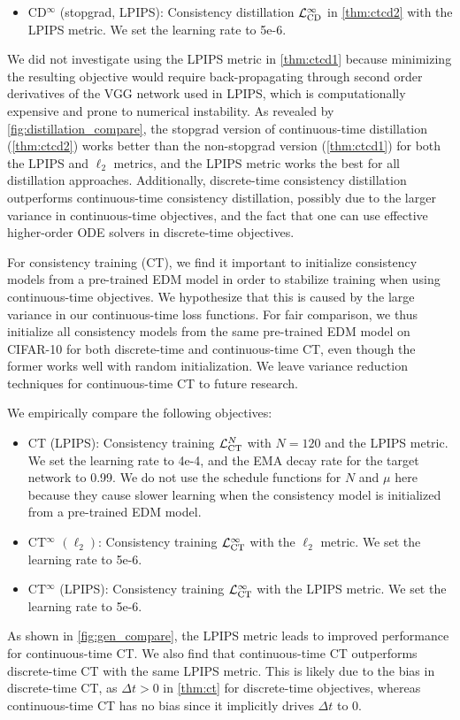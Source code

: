 \begin{appendices}
\begin{itemize}
    \item CD$^\infty$ (stopgrad, LPIPS): Consistency distillation $\mathcal{L}^\infty_\text{CD}$ in \cref{thm:ctcd2} with the LPIPS metric. We set the learning rate to 5e-6.
\end{itemize}
We did not investigate using the LPIPS metric in \cref{thm:ctcd1} because minimizing the resulting objective would require back-propagating through second order derivatives of the VGG network used in LPIPS, which is computationally expensive and prone to numerical instability. As revealed by \cref{fig:distillation_compare}, the stopgrad version of continuous-time distillation (\cref{thm:ctcd2}) works better than the non-stopgrad version (\cref{thm:ctcd1}) for both the LPIPS and $\ell_2$ metrics, and the LPIPS metric works the best for all distillation approaches. Additionally, discrete-time consistency distillation outperforms continuous-time consistency distillation, possibly due to the larger variance in continuous-time objectives, and the fact that one can use effective higher-order ODE solvers in discrete-time objectives.

For consistency training (CT), we find it important to initialize consistency models from a pre-trained EDM model in order to stabilize training when using continuous-time objectives. We hypothesize that this is caused by the large variance in our continuous-time loss functions. For fair comparison, we thus initialize all consistency models from the same pre-trained EDM model on CIFAR-10 for both discrete-time and continuous-time CT, even though the former works well with random initialization. We leave variance reduction techniques for continuous-time CT to future research.

We empirically compare the following objectives:
\begin{itemize}
    \item CT (LPIPS): Consistency training $\mathcal{L}_\text{CT}^N$ with $N=120$ and the LPIPS metric. We set the learning rate to 4e-4, and the EMA decay rate for the target network to 0.99. We do not use the schedule functions for $N$ and $\mu$ here because they cause slower learning when the consistency model is initialized from a pre-trained EDM model.
    \item CT$^\infty$ $(\ell_2)$: Consistency training $\mathcal{L}^{\infty}_\text{CT}$ with the $\ell_2$ metric. We set the learning rate to 5e-6.
    \item CT$^\infty$ (LPIPS): Consistency training $\mathcal{L}^\infty_\text{CT}$ with the LPIPS metric. We set the learning rate to 5e-6.
\end{itemize}
As shown in \cref{fig:gen_compare}, the LPIPS metric leads to improved performance for continuous-time CT. We also find that continuous-time CT outperforms discrete-time CT with the same LPIPS metric. This is likely due to the bias in discrete-time CT, as $\Delta t > 0$ in \cref{thm:ct} for discrete-time objectives, whereas continuous-time CT has no bias since it implicitly drives $\Delta t$ to $0$.


\end{appendices}
